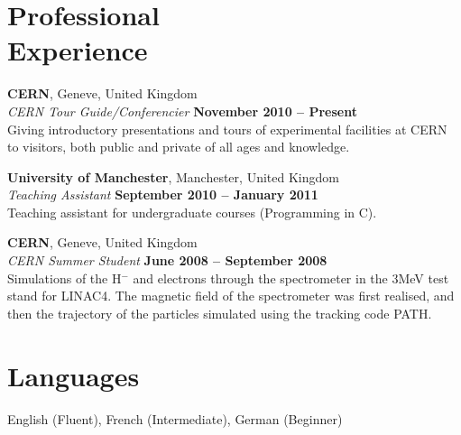 \documentclass[margin,line]{resume}
\begin{document}
\begin{resume}
    \section{\mysidestyle Professional\\Experience}


    \textbf{CERN}, Geneve, United Kingdom \vspace{2mm}\\\vspace{1mm}%
    \textsl{CERN Tour Guide/Conferencier} \hfill \textbf{November 2010 -- Present}\\
    Giving introductory presentations and tours of experimental facilities at CERN to visitors, both public and private of all ages and knowledge.

    \textbf{University of Manchester}, Manchester, United Kingdom \vspace{2mm}\\\vspace{1mm}%
    \textsl{Teaching Assistant} \hfill \textbf{September 2010 -- January 2011}\\
    Teaching assistant for undergraduate courses (Programming in C).

    \textbf{CERN}, Geneve, United Kingdom \vspace{2mm}\\\vspace{1mm}%
    \textsl{CERN Summer Student} \hfill \textbf{June 2008 -- September 2008}\\
    Simulations of the H$^{-}$ and electrons through the spectrometer in the 3MeV test stand for LINAC4. The magnetic field of the spectrometer was first realised, and then the trajectory of the particles simulated using the tracking code PATH.


    \section{\mysidestyle Languages} 

   English (Fluent), French (Intermediate), German (Beginner)



\end{resume}
\end{document}
